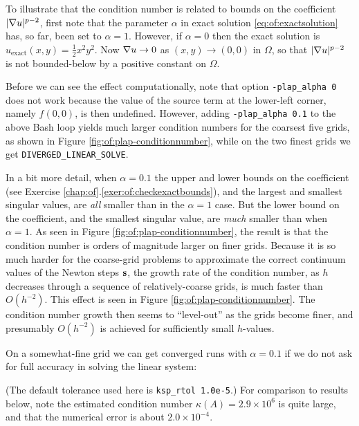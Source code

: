 To illustrate that the condition number is related to bounds on the coefficient $|\nabla u|^{p-2}$, first note that the parameter $\alpha$ in exact solution \eqref{eq:of:exactsolution} has, so far, been set to $\alpha = 1$.  However, if $\alpha=0$ then the exact solution is $u_{\text{exact}}(x,y) = \frac{1}{2} x^2 y^2$.  Now $\nabla u \to 0$ as $(x,y)\to(0,0)$ in $\Omega$, so that $|\nabla u|^{p-2}$ is not bounded-below by a positive constant on $\Omega$.

Before we can see the effect computationally, note that option \texttt{-plap\_alpha 0} does not work because the value of the source term at the lower-left corner, namely $f(0,0)$, is then undefined.  However, adding \texttt{-plap\_alpha 0.1} to the above Bash loop yields much larger condition numbers for the coarsest five grids, as shown in Figure \ref{fig:of:plap-conditionnumber}, while on the two finest grids we get \texttt{DIVERGED\_LINEAR\_SOLVE}.

In a bit more detail, when $\alpha=0.1$ the upper and lower bounds on the coefficient (see Exercise \ref{chap:of}.\ref{exer:of:checkexactbounds}), and the largest and smallest singular values, are \emph{all} smaller than in the $\alpha=1$ case.  But the lower bound on the coefficient, and the smallest singular value, are \emph{much} smaller than when $\alpha=1$.  As seen in Figure \ref{fig:of:plap-conditionnumber}, the result is that the condition number is orders of magnitude larger on finer grids.  Because it is so much harder for the coarse-grid problems to approximate the correct continuum values of the Newton steps $\mathbf{s}$, the growth rate of the condition number, as $h$ decreases through a sequence of relatively-coarse grids, is much faster than $O(h^{-2})$.  This effect is seen in Figure \ref{fig:of:plap-conditionnumber}.  The condition number growth then seems to ``level-out'' as the grids become finer, and presumably $O(h^{-2})$ is achieved for sufficiently small $h$-values.

On a somewhat-fine grid we can get converged runs with $\alpha=0.1$ if we do not ask for full accuracy in solving the linear system:
(The default tolerance used here is \texttt{ksp\_rtol 1.0e-5}.)  For comparison to results below, note the estimated condition number $\kappa(A)=2.9^6$ is quite large, and that the numerical error is about $2.0^{-4}$.

